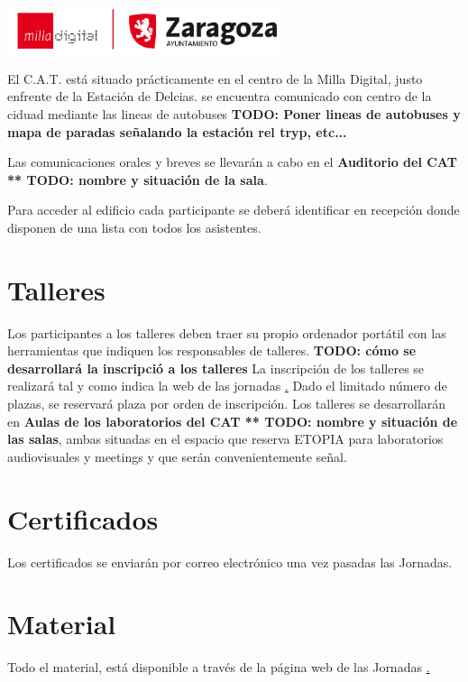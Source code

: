 \begin{center}
\includegraphics[width=0.6\textwidth]{Logos/logoMillaAyZgz.png}
\end{center}

El C.A.T. está situado prácticamente en el centro de la Milla Digital, 
justo enfrente de la Estación de Delcias.  se encuentra comunicado con centro de la ciduad mediante las lineas de autobuses
\textbf{TODO: Poner lineas de autobuses y mapa de paradas señalando
la estación rel tryp, etc...}

Las comunicaciones orales y breves se llevarán a cabo en el 
\textbf{Auditorio del CAT ** TODO: nombre y situación de la sala}. 

Para acceder al edificio cada participante se deberá identificar en
recepción donde disponen de una lista con todos los asistentes.


\section{Talleres}

Los participantes a los talleres deben traer su propio ordenador
portátil con las herramientas que indiquen los responsables de
talleres. \textbf{TODO: cómo se desarrollará la inscripció a los
  talleres} La inscripción de los talleres se realizará tal y como
indica la web de las jornadas
\href{http://r-es.org/V+Jornadas#Talleres}.  Dado el limitado número
de plazas, se reservará plaza por orden de inscripción. Los talleres
se desarrollarán en \textbf{Aulas de los laboratorios del CAT ** TODO:
  nombre y situación de las salas}, ambas situadas en el espacio que
reserva ETOPIA para laboratorios audiovisuales y meetings y que serán
convenientemente señal.


\section{Certificados}
Los certificados se enviarán por correo electrónico una vez pasadas
las Jornadas.  

\section{Material}

Todo el material, está disponible a través de la página web de las Jornadas 
\href{http://r-es.org/V+Jornadas}. 




